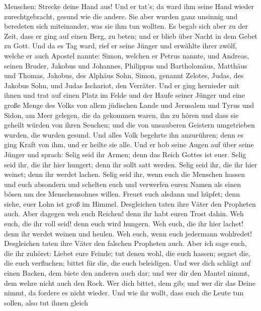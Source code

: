 Menschen: Strecke deine Hand aus! Und er tat's; da ward ihm seine Hand
wieder zurechtgebracht, gesund wie die andere.  Sie aber
wurden ganz unsinnig und beredeten sich miteinander, was sie ihm tun
wollten.  Es begab sich aber zu der Zeit, dass er ging auf
einen Berg, zu beten; und er blieb über Nacht in dem Gebet zu Gott.
 Und da es Tag ward, rief er seine Jünger und erwählte
ihrer zwölf, welche er auch Apostel nannte:  Simon, welchen
er Petrus nannte, und Andreas, seinen Bruder, Jakobus und Johannes,
Philippus und Bartholomäus,  Matthäus und Thomas, Jakobus,
des Alphäus Sohn, Simon, genannt Zelotes,  Judas, des
Jakobus Sohn, und Judas Ischariot, den Verräter.  Und er
ging hernieder mit ihnen und trat auf einen Platz im Felde und der Haufe
seiner Jünger und eine große Menge des Volks von allem jüdischen Lande
und Jerusalem und Tyrus und Sidon, am Meer gelegen,  die da
gekommen waren, ihn zu hören und dass sie geheilt würden von ihren
Seuchen; und die von unsauberen Geistern umgetrieben wurden, die wurden
gesund.  Und alles Volk begehrte ihn anzurühren; denn es
ging Kraft von ihm, und er heilte sie alle.  Und er hob
seine Augen auf über seine Jünger und sprach: Selig seid ihr Armen; denn
das Reich Gottes ist euer.  Selig seid ihr, die ihr hier
hungert; denn ihr sollt satt werden. Selig seid ihr, die ihr hier
weinet; denn ihr werdet lachen.  Selig seid ihr, wenn euch
die Menschen hassen und euch absondern und schelten euch und verwerfen
euren Namen als einen bösen um des Menschensohnes willen. 
Freuet euch alsdann und hüpfet; denn siehe, euer Lohn ist groß im
Himmel. Desgleichen taten ihre Väter den Propheten auch. 
Aber dagegen weh euch Reichen! denn ihr habt euren Trost dahin.
 Weh euch, die ihr voll seid! denn euch wird hungern. Weh
euch, die ihr hier lachet! denn ihr werdet weinen und heulen.
 Weh euch, wenn euch jedermann wohlredet! Desgleichen taten
ihre Väter den falschen Propheten auch.  Aber ich sage
euch, die ihr zuhöret: Liebet eure Feinde; tut denen wohl, die euch
hassen;  segnet die, die euch verfluchen; bittet für die,
die euch beleidigen.  Und wer dich schlägt auf einen
Backen, dem biete den anderen auch dar; und wer dir den Mantel nimmt,
dem wehre nicht auch den Rock.  Wer dich bittet, dem gib;
und wer dir das Deine nimmt, da fordere es nicht wieder. 
Und wie ihr wollt, dass euch die Leute tun sollen, also tut ihnen gleich
